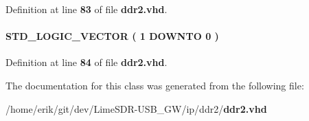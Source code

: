 Definition at line {\bf 83} of file {\bf ddr2.\+vhd}.

\paragraph[{signal\+\_\+wire9}]{ {\bfseries \textcolor{comment}{S\+T\+D\+\_\+\+L\+O\+G\+I\+C\+\_\+\+V\+E\+C\+T\+OR}\textcolor{vhdlchar}{ }\textcolor{vhdlchar}{(}\textcolor{vhdlchar}{ }\textcolor{vhdlchar}{ } \textcolor{vhdldigit}{1} \textcolor{vhdlchar}{ }\textcolor{keywordflow}{D\+O\+W\+N\+TO}\textcolor{vhdlchar}{ }\textcolor{vhdlchar}{ } \textcolor{vhdldigit}{0} \textcolor{vhdlchar}{ }\textcolor{vhdlchar}{)}\textcolor{vhdlchar}{ }} \hspace{0.3cm}{\ttfamily [Signal]}}\label{classddr2_1_1SYN_a845014491eae2d14d22da62f6692ccdb}


Definition at line {\bf 84} of file {\bf ddr2.\+vhd}.



The documentation for this class was generated from the following file\+:\begin{DoxyCompactItemize}
\item 
/home/erik/git/dev/\+Lime\+S\+D\+R-\/\+U\+S\+B\+\_\+\+G\+W/ip/ddr2/{\bf ddr2.\+vhd}\end{DoxyCompactItemize}
